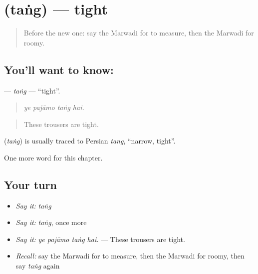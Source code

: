 \section[\texorpdfstring{\mw{तंग} (taṅg)}{तंग (taṅg)}]{ (taṅg) — tight}

\label{lesson:MW-C211-tang}



\begin{quote}
Before the new one: say the Marwadi for to measure, then the Marwadi for roomy.
\end{quote}

\subsection*{You'll want to know: }
\textbf{} — \emph{taṅg} — \textquotedblleft{}tight\textquotedblright{}.

\begin{quote}
   
\end{quote}

\begin{quote}
\emph{ye pajāmo taṅg hai.}
\end{quote}

\begin{quote}
These trousers are tight.
\end{quote}

\begin{cousinweb}
\textbf{} (\emph{taṅg}) is usually traced to Persian \emph{tang}, \textquotedblleft{}narrow, tight\textquotedblright{}.
\end{cousinweb}

\begin{grammarlens}[title={What you've built}]
One more word for this chapter.
\end{grammarlens}

\subsection*{Your turn}
\begin{itemize}
\raggedright
  \item \emph{Say it:} \emph{taṅg}
  \item \emph{Say it:} \emph{taṅg}, once more
  \item \emph{Say it:} \emph{ye pajāmo taṅg hai.} — These trousers are tight.
  \item \emph{Recall:} say the Marwadi for to measure, then the Marwadi for roomy, then say \emph{taṅg} again
\end{itemize}

